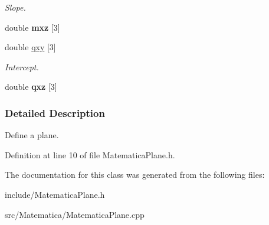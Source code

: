 \begin{DoxyCompactItemize}
\begin{DoxyCompactList}\small\item\em Slope. \end{DoxyCompactList}\item 
double {\bfseries mxz} \mbox{[}3\mbox{]}\hypertarget{classPiano_a1d227138d7d70c0c41daccf38c22dd56}{}\label{classPiano_a1d227138d7d70c0c41daccf38c22dd56}

\item 
double \hyperlink{classPiano_adec87ca29093f1081bf0ce93a026c107}{qxy} \mbox{[}3\mbox{]}\hypertarget{classPiano_adec87ca29093f1081bf0ce93a026c107}{}\label{classPiano_adec87ca29093f1081bf0ce93a026c107}

\begin{DoxyCompactList}\small\item\em Intercept. \end{DoxyCompactList}\item 
double {\bfseries qxz} \mbox{[}3\mbox{]}\hypertarget{classPiano_a5b42094ccf2602beb24464acdd28c0ac}{}\label{classPiano_a5b42094ccf2602beb24464acdd28c0ac}

\end{DoxyCompactItemize}


\subsubsection{Detailed Description}
Define a plane. 

Definition at line 10 of file Matematica\+Plane.\+h.



The documentation for this class was generated from the following files\+:\begin{DoxyCompactItemize}
\item 
include/Matematica\+Plane.\+h\item 
src/\+Matematica/Matematica\+Plane.\+cpp\end{DoxyCompactItemize}
